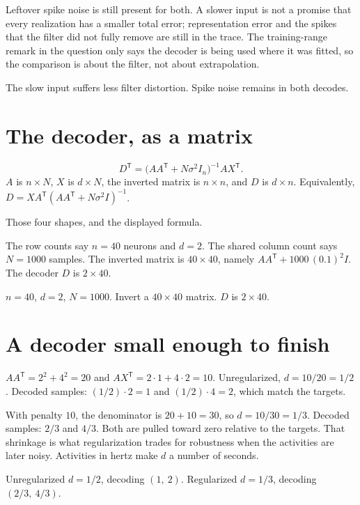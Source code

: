 \documentclass[11pt,letterpaper]{article}
\newcommand{\T}{\mathsf{T}}
\newcommand{\ans}[1]{\par\vspace{2pt}{\bfseries #1}\quad}
\begin{document}
Leftover spike noise is still present for both. A slower input is not a promise that every realization has a smaller total error; representation error and the spikes that the filter did not fully remove are still in the trace. The training-range remark in the question only says the decoder is being used where it was fitted, so the comparison is about the filter, not about extrapolation.
\begin{result}
The slow input suffers less filter distortion. Spike noise remains in both decodes.
\end{result}

\section{The decoder, as a matrix}

\ans{1.}
\[
D^{\T} = \bigl(AA^{\T} + N\sigma^2 I_n\bigr)^{-1} AX^{\T}.
\]
$A$ is $n \times N$, $X$ is $d \times N$, the inverted matrix is $n \times n$, and $D$ is $d \times n$. Equivalently, $D = XA^{\T}(AA^{\T} + N\sigma^2 I)^{-1}$.
\begin{result}
Those four shapes, and the displayed formula.
\end{result}

\ans{2.}
The row counts say $n = 40$ neurons and $d = 2$. The shared column count says $N = 1000$ samples. The inverted matrix is $40 \times 40$, namely $AA^{\T} + 1000\,(0.1)^2 I$. The decoder $D$ is $2 \times 40$.
\begin{result}
$n = 40$, $d = 2$, $N = 1000$. Invert a $40 \times 40$ matrix. $D$ is $2 \times 40$.
\end{result}

\section{A decoder small enough to finish}

\ans{1.}
$AA^{\T} = 2^2 + 4^2 = 20$ and $AX^{\T} = 2\cdot 1 + 4\cdot 2 = 10$. Unregularized, $d = 10/20 = 1/2$. Decoded samples: $(1/2)\cdot 2 = 1$ and $(1/2)\cdot 4 = 2$, which match the targets.

With penalty $10$, the denominator is $20 + 10 = 30$, so $d = 10/30 = 1/3$. Decoded samples: $2/3$ and $4/3$. Both are pulled toward zero relative to the targets. That shrinkage is what regularization trades for robustness when the activities are later noisy. Activities in hertz make $d$ a number of seconds.
\begin{result}
Unregularized $d = 1/2$, decoding $(1,\ 2)$. Regularized $d = 1/3$, decoding $(2/3,\ 4/3)$.
\end{result}
\end{document}
